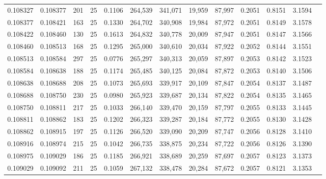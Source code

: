 \begin{tabular}{rrrrrrrrrrrrr}
0.108327 & 0.108377 &   201 &  25 &                                     0.1106 & 264,539 & 341,071 &  19,959 &  87,997 & 0.2051 & 0.8151 & 3.1594 \\
0.108377 & 0.108421 &   163 &  25 &                                     0.1330 & 264,702 & 340,908 &  19,984 &  87,972 & 0.2051 & 0.8149 & 3.1578 \\
0.108422 & 0.108460 &   130 &  25 &                                     0.1613 & 264,832 & 340,778 &  20,009 &  87,947 & 0.2051 & 0.8147 & 3.1566 \\
0.108460 & 0.108513 &   168 &  25 &                                     0.1295 & 265,000 & 340,610 &  20,034 &  87,922 & 0.2052 & 0.8144 & 3.1551 \\
0.108513 & 0.108584 &   297 &  25 &                                     0.0776 & 265,297 & 340,313 &  20,059 &  87,897 & 0.2053 & 0.8142 & 3.1523 \\
0.108584 & 0.108638 &   188 &  25 &                                     0.1174 & 265,485 & 340,125 &  20,084 &  87,872 & 0.2053 & 0.8140 & 3.1506 \\
0.108638 & 0.108688 &   208 &  25 &                                     0.1073 & 265,693 & 339,917 &  20,109 &  87,847 & 0.2054 & 0.8137 & 3.1487 \\
0.108688 & 0.108750 &   230 &  25 &                                     0.0980 & 265,923 & 339,687 &  20,134 &  87,822 & 0.2054 & 0.8135 & 3.1465 \\
0.108750 & 0.108811 &   217 &  25 &                                     0.1033 & 266,140 & 339,470 &  20,159 &  87,797 & 0.2055 & 0.8133 & 3.1445 \\
0.108811 & 0.108862 &   183 &  25 &                                     0.1202 & 266,323 & 339,287 &  20,184 &  87,772 & 0.2055 & 0.8130 & 3.1428 \\
0.108862 & 0.108915 &   197 &  25 &                                     0.1126 & 266,520 & 339,090 &  20,209 &  87,747 & 0.2056 & 0.8128 & 3.1410 \\
0.108916 & 0.108974 &   215 &  25 &                                     0.1042 & 266,735 & 338,875 &  20,234 &  87,722 & 0.2056 & 0.8126 & 3.1390 \\
0.108975 & 0.109029 &   186 &  25 &                                     0.1185 & 266,921 & 338,689 &  20,259 &  87,697 & 0.2057 & 0.8123 & 3.1373 \\
0.109029 & 0.109092 &   211 &  25 &                                     0.1059 & 267,132 & 338,478 &  20,284 &  87,672 & 0.2057 & 0.8121 & 3.1353 \\

\end{tabular}
